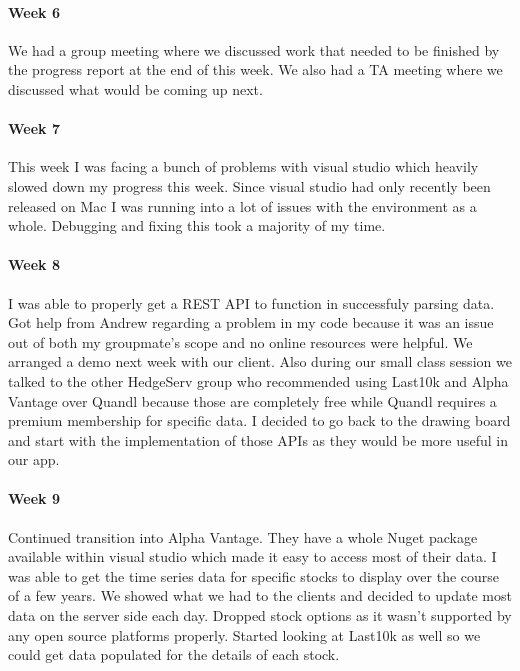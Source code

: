 \documentclass[onecolumn, draftclsnofoot,10pt, compsoc]{IEEEtran}
\begin{document}
    \paragraph{Week 6}
    We had a group meeting where we discussed work that needed to be finished by the progress report at the end of this week. We also had a TA meeting where we discussed what would be coming up next. 
    
    \paragraph{Week 7} 
    This week I was facing a bunch of problems with visual studio which heavily slowed down my progress this week. Since visual studio had only recently been released on Mac I was running into a lot of issues with the environment as a whole. Debugging and fixing this took a majority of my time. 
    
    \paragraph{Week 8}
    I was able to properly get a REST API to function in successfuly parsing data. Got help from Andrew regarding a problem in my code because it was an issue out of both my groupmate's scope and no online resources were helpful. We arranged a demo next week with our client. Also during our small class session we talked to the other HedgeServ group who recommended using Last10k and Alpha Vantage over Quandl because those are completely free while Quandl requires a premium membership for specific data. I decided to go back to the drawing board and start with the implementation of those APIs as they would be more useful in our app. 
    
    \paragraph{Week 9} 
    Continued transition into Alpha Vantage. They have a whole Nuget package available within visual studio which made it easy to access most of their data. I was able to get the time series data for specific stocks to display over the course of a few years. We showed what we had to the clients and decided to update most data on the server side each day. Dropped stock options as it wasn't supported by any open source platforms properly. Started looking at Last10k as well so we could get data populated for the  details of each stock.
    
\end{document}
